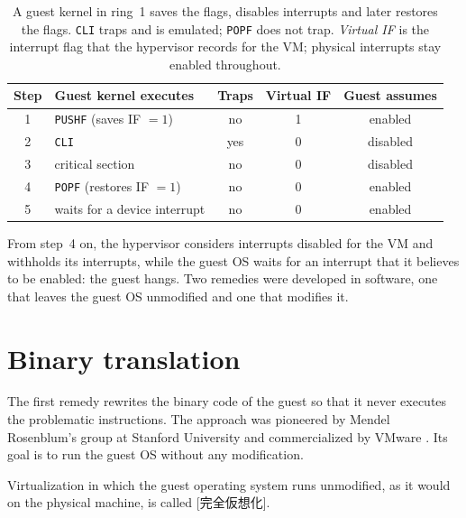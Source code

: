 \documentclass[../main.tex]{subfiles}
\begin{document}
\begin{table}[htbp]
  \centering
  \caption{A guest kernel in ring~1 saves the flags, disables interrupts
    and later restores the flags.  \texttt{CLI} traps and is emulated;
    \texttt{POPF} does not trap.  \emph{Virtual IF} is the interrupt flag
    that the hypervisor records for the VM; physical interrupts stay
    enabled throughout.}
  \label{tab:l12-popf}
  \small
  \begin{tabular}{@{}clccc@{}}
    \toprule
    Step & Guest kernel executes & Traps & Virtual IF & Guest assumes \\
    \midrule
    1 & \texttt{PUSHF} (saves IF $=1$)     & no  & 1 & enabled \\
    2 & \texttt{CLI}                         & yes & 0 & disabled \\
    3 & critical section                     & no  & 0 & disabled \\
    4 & \texttt{POPF} (restores IF $=1$)   & no  & 0 & enabled \\
    5 & waits for a device interrupt         & no  & 0 & enabled \\
    \bottomrule
  \end{tabular}
\end{table}

From step~4 on, the hypervisor considers interrupts disabled for the VM and
withholds its interrupts, while the guest OS waits for an interrupt that it
believes to be enabled: the guest hangs.  Two remedies were developed in
software, one that leaves the guest OS unmodified and one that modifies it.

\section{Binary translation}
\label{sec:l12-bt}

The first remedy rewrites the binary code of the guest so that it never
executes the problematic instructions.  The
approach was pioneered by Mendel Rosenblum's group at Stanford University
and commercialized by VMware \cite{bugnion2012}.  Its goal is to run the
guest OS without any modification.

\begin{definition}
  Virtualization in which the guest operating system runs unmodified, as
  it would on the physical machine, is called
  [完全仮想化].
\end{definition}
\end{document}
